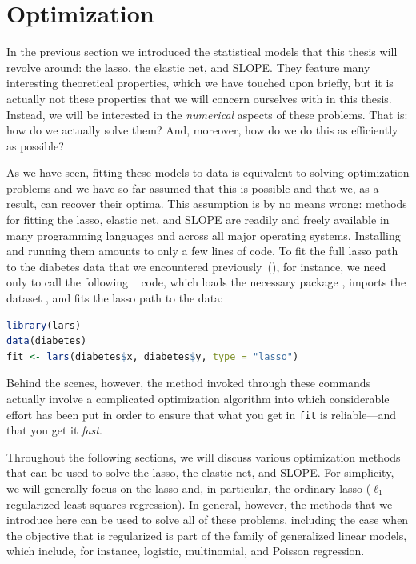 \section{Optimization}\label{sec:optimization}

In the previous section we introduced the statistical models that this thesis will revolve around: the lasso, the elastic net, and SLOPE. They feature many interesting theoretical properties, which we have touched upon briefly, but it is actually not these properties that we will concern ourselves with in this thesis. Instead, we will be interested in the \emph{numerical} aspects of these problems. That is: how do we actually solve them? And, moreover, how do we do this as efficiently as possible?

As we have seen, fitting these models to data is equivalent to solving optimization problems and we have so far assumed that this is possible and that we, as a result, can recover their optima. This assumption is by no means wrong: methods for fitting the lasso, elastic net, and SLOPE are readily and freely available in many programming languages and across all major operating systems. Installing and running them amounts to only a few lines of code. To fit the full lasso path to the diabetes data that we encountered previously~(), for instance, we need only to call the following ~\parencite{rcoreteam2024} code, which loads the necessary  package , imports the dataset , and fits the lasso path to the data:

\begin{lstlisting}[language=R]
library(lars)
data(diabetes)
fit <- lars(diabetes$x, diabetes$y, type = "lasso")
\end{lstlisting}

Behind the scenes, however, the method invoked through these commands actually involve a complicated optimization algorithm into which considerable effort has been put in order to ensure that what you get in \texttt{fit} is reliable---and that you get it \emph{fast}.

Throughout the following sections, we will discuss various optimization methods that can be used to solve the lasso, the elastic net, and SLOPE. For simplicity, we will generally focus on the lasso and, in particular, the ordinary lasso (\(\ell_1\)-regularized least-squares regression). In general, however, the methods that we introduce here can be used to solve all of these problems, including the case when the objective that is regularized is part of the family of generalized linear models, which include, for instance, logistic, multinomial, and Poisson regression.

